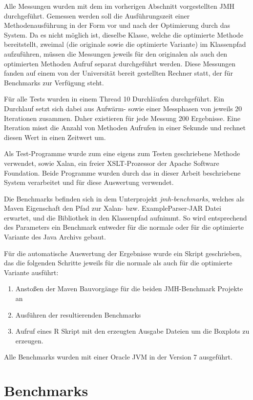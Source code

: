 Alle Messungen wurden mit dem im vorherigen Abschnitt vorgestellten JMH durchgeführt. 
Gemessen werden soll die Ausführungszeit einer Methodenausführung in der Form vor und 
nach der Optimierung durch das System. Da es nicht möglich ist,
dieselbe Klasse, welche die optimierte Methode bereitstellt, zweimal (die originale 
sowie die optimierte Variante) im Klassenpfad aufzuführen, müssen die Messungen
jeweils für den originalen als auch den optimierten Methoden Aufruf separat durchgeführt werden.
Diese Messungen fanden auf einem von der Universität bereit gestellten Rechner statt,
der für Benchmarks zur Verfügung steht. 

Für alle Tests wurden in einem Thread 10 Durchläufen durchgeführt. Ein Durchlauf setzt
sich dabei aus Aufwärm- sowie einer Messphasen von jeweils 20 Iterationen zusammen. 
Daher existieren für jede Messung 200 Ergebnisse. Eine Iteration misst die Anzahl von 
Methoden Aufrufen in einer Sekunde und rechnet diesen Wert in einen Zeitwert um. 

Als Test-Programme wurde zum eine eigens zum Testen geschriebene Methode verwendet, 
sowie Xalan, ein freier XSLT-Prozessor der Apache Software Foundation. Beide Programme
wurden durch das in dieser Arbeit beschriebene System verarbeitet und für diese  
Auswertung verwendet.

Die Benchmarks befinden sich in dem Unterprojekt \textit{jmh-benchmarks}, welches als
Maven Eigenschaft den Pfad zur Xalan- bzw. ExampleParser-JAR Datei erwartet, und die
Bibliothek in den Klassenpfad aufnimmt. So wird entsprechend des Parameters ein
Benchmark entweder für die normale oder für die optimierte Variante des Java Archivs
gebaut. 

Für die automatische Auswertung der Ergebnisse wurde ein Skript geschrieben, das die 
folgenden Schritte jeweils für die normale als auch für die optimierte Variante ausführt:

\begin{enumerate}
	\item Anstoßen der Maven Bauvorgänge für die beiden JMH-Benchmark Projekte an
	\item Ausführen der resultierenden Benchmarks
	\item Aufruf eines R Skript mit den erzeugten Ausgabe Dateien um die Boxplots zu erzeugen. 
\end{enumerate}

Alle Benchmarks wurden mit einer Oracle JVM in der Version 7 ausgeführt. 

\section{Benchmarks}

